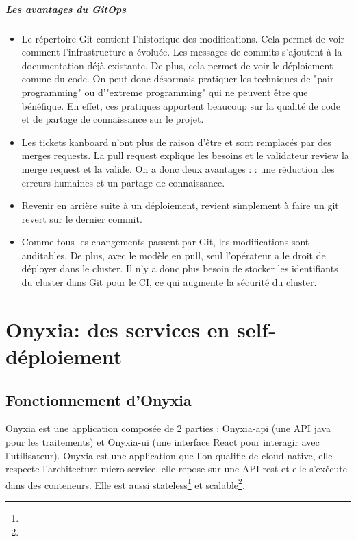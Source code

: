 \documentclass[11pt,fleqn]{book} %
\begin{document}
\begin{interrupt}
\paragraph{Les avantages du GitOps}
\begin{itemize}
    \item Le répertoire Git contient l'historique des modifications. Cela permet de voir comment l'infrastructure a évoluée. Les messages de commits s'ajoutent à la documentation déjà existante. De plus, cela permet de voir le déploiement comme du code. On peut donc désormais pratiquer les techniques de "pair programming" ou d'"extreme programming" qui ne peuvent être que bénéfique. En effet, ces pratiques apportent beaucoup sur la qualité de code et de partage de connaissance sur le projet.
    \item Les tickets kanboard n'ont plus de raison d'être et sont remplacés par des merges requests. La pull request explique les besoins et le validateur review la merge request et la valide. On a donc deux avantages : : une réduction des erreurs humaines et un partage de connaissance.
    \item Revenir en arrière suite à un déploiement, revient simplement à faire un git revert sur le dernier commit.
    \item Comme tous les changements passent par Git, les modifications sont auditables. De plus, avec le  modèle en pull, seul l’opérateur a le droit de déployer dans le cluster. Il n'y a donc plus besoin de stocker les identifiants du cluster dans Git pour le CI, ce qui augmente la sécurité du cluster.
\end{itemize}
\end{interrupt}


\chapter{Onyxia: des services en self-déploiement}
\vspace{-2cm}

\section{Fonctionnement d'Onyxia}
Onyxia est une application composée de 2 parties : Onyxia-api (une API java pour les traitements) et Onyxia-ui (une interface React pour interagir avec l'utilisateur). Onyxia est une application que l'on qualifie de cloud-native, elle respecte l'architecture micro-service, elle repose sur une API rest et elle s'exécute dans des conteneurs. Elle est aussi stateless\footnote{} et scalable\footnote{}.\\
\end{document}
